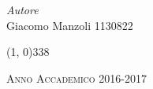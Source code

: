 \documentclass[a4paper, 11pt]{article} %
\begin{document}
\begin{titlepage}
\begin{center}
		\vspace{10pt} 
		
		\vspace{60pt} 
		
		\begin{large}
			
			\begin{flushright}
				\textit{Autore}\\ 
				\vspace{5pt} 
				Giacomo Manzoli 1130822
			\end{flushright}
		\end{large}
		
		\vspace{160pt}
		
		\line(1, 0){338} \\
		\begin{normalsize}
			\textsc{Anno Accademico 2016-2017}
		\end{normalsize}
		
	\end{center}
\end{titlepage} 





	
	
	\clearpage
	\tableofcontents
	
	
	
	\clearpage
	\appendix						
	
	
\end{document}
